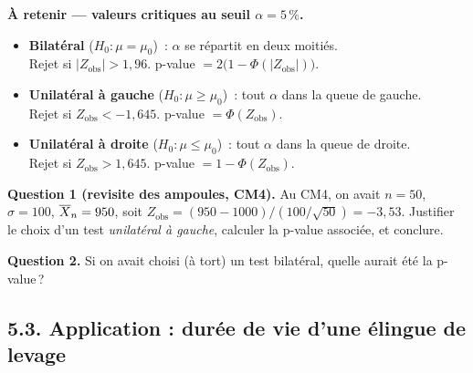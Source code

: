 \medskip

\begin{mdframed}[backgroundcolor=ThemeLight, linecolor=Theme,
  linewidth=1pt, innertopmargin=8pt, innerbottommargin=8pt, nobreak=true]
\textbf{À retenir --- valeurs critiques au seuil $\alpha = 5\,\%$.}
\begin{itemize}\setlength{\itemsep}{0.2em}
  \item \textbf{Bilatéral} ($H_0 : \mu = \mu_0$)~: $\alpha$ se répartit en deux moitiés. \\
  Rejet si $|Z_{\text{obs}}| > 1{,}96$. \quad p-value $= 2\bigl(1-\Phi(|Z_{\text{obs}}|)\bigr)$.
  \item \textbf{Unilatéral à gauche} ($H_0 : \mu \ge \mu_0$)~: tout $\alpha$ dans la queue de gauche. \\
  Rejet si $Z_{\text{obs}} < -1{,}645$. \quad p-value $= \Phi(Z_{\text{obs}})$.
  \item \textbf{Unilatéral à droite} ($H_0 : \mu \le \mu_0$)~: tout $\alpha$ dans la queue de droite. \\
  Rejet si $Z_{\text{obs}} > 1{,}645$. \quad p-value $= 1-\Phi(Z_{\text{obs}})$.
\end{itemize}
\end{mdframed}

\medskip

\textbf{Question 1 (revisite des ampoules, CM4).} Au CM4, on avait $n=50$, $\sigma=100$, $\overline{X}_n=950$, soit
$Z_{\text{obs}} = (950-1000)/(100/\sqrt{50}) = -3{,}53$. Justifier le choix d'un test \emph{unilatéral à gauche}, calculer la p-value associée, et conclure.


\textbf{Question 2.} Si on avait choisi (à tort) un test bilatéral, quelle aurait été la p-value\,?


\subsection*{5.3. Application : durée de vie d'une élingue de levage}

